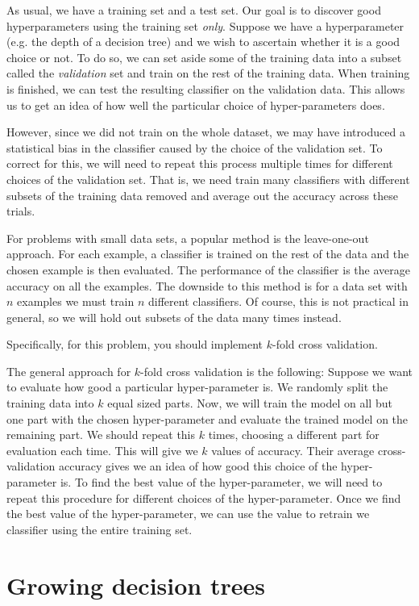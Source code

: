 As usual, we have a training set and a test set. Our goal is to discover good
hyperparameters using the training set \emph{only}. Suppose we have a
hyperparameter (e.g. the depth of a decision tree) and we wish to ascertain
whether it is a good choice or not. To do so, we can set aside some of the
training data into a subset called the {\em validation} set and train on the
rest of the training data. When training is finished, we can test the resulting
classifier on the validation data. This allows us to get an idea of how well the
particular choice of hyper-parameters does.

However, since we did not train on the whole dataset, we may have introduced a
statistical bias in the classifier caused by the choice of the validation
set. To correct for this, we will need to repeat this process multiple times for
different choices of the validation set. That is, we need train many classifiers
with different subsets of the training data removed and average out the accuracy
across these trials.

For problems with small data sets, a popular method is the leave-one-out
approach. For each example, a classifier is trained on the rest of the data and
the chosen example is then evaluated. The performance of the classifier is the
average accuracy on all the examples.  The downside to this method is for a data
set with $n$ examples we must train $n$ different classifiers. Of course, this
is not practical in general, so we will hold out subsets of the data many times
instead.

Specifically, for this problem, you should implement $k$-fold cross validation.

The general approach for $k$-fold cross validation is the following: Suppose we
want to evaluate how good a particular hyper-parameter is. We randomly split the
training data into $k$ equal sized parts. Now, we will train the model on all
but one part with the chosen hyper-parameter and evaluate the trained model on
the remaining part. We should repeat this $k$ times, choosing a different part
for evaluation each time. This will give we $k$ values of accuracy.  Their
average cross-validation accuracy gives we an idea of how good this choice of
the hyper-parameter is. To find the best value of the hyper-parameter, we will
need to repeat this procedure for different choices of the hyper-parameter. Once
we find the best value of the hyper-parameter, we can use the value to retrain
we classifier using the entire training set.

\section*{Growing decision trees}

